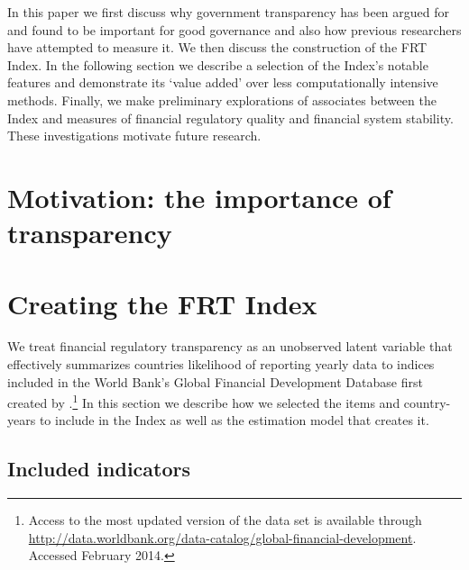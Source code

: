 \documentclass[a4paper]{article}
\begin{document}
In this paper we first discuss why government transparency has been argued for and found to be important for good governance and also how previous researchers have attempted to measure it. We then discuss the construction of the FRT Index. In the following section we describe a selection of the Index's notable features and demonstrate its `value added' over less computationally intensive methods. Finally, we make preliminary explorations of associates between the Index and measures of financial regulatory quality and financial system stability. These investigations motivate future research.

\section{Motivation: the importance of transparency}


\section{Creating the FRT Index}

We treat financial regulatory transparency as an unobserved latent variable that effectively summarizes countries likelihood of reporting yearly data to indices included in the World Bank's Global Financial Development Database first created by \cite{Cihak2012}.\footnote{Access to the most updated version of the data set is available through \url{http://data.worldbank.org/data-catalog/global-financial-development}. Accessed February 2014.} In this section we describe how we selected the items and country-years to include in the Index as well as the estimation model that creates it.

\subsection{Included indicators}
\end{document}
